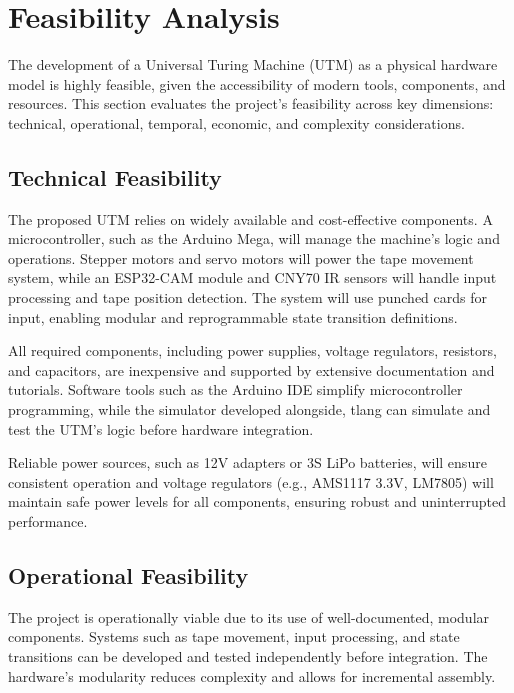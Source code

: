 \chapter{Feasibility Analysis}

The development of a Universal Turing Machine (UTM) as a physical hardware model is highly feasible, given the accessibility of modern tools, components, and resources. This section evaluates the project’s feasibility across key dimensions: technical, operational, temporal, economic, and complexity considerations.

\section{Technical Feasibility}

The proposed UTM relies on widely available and cost-effective components. A microcontroller, such as the Arduino Mega, will manage the machine's logic and operations. Stepper motors and servo motors will power the tape movement system, while an ESP32-CAM module and CNY70 IR sensors will handle input processing and tape position detection. The system will use punched cards for input, enabling modular and reprogrammable state transition definitions.

All required components, including power supplies, voltage regulators, resistors, and capacitors, are inexpensive and supported by extensive documentation and tutorials. Software tools such as the Arduino IDE simplify microcontroller programming, while the simulator developed alongside, tlang\cite{tlang} can simulate and test the UTM’s logic before hardware integration. 

Reliable power sources, such as 12V adapters or 3S LiPo batteries, will ensure consistent operation and voltage regulators (e.g., AMS1117 3.3V, LM7805) will maintain safe power levels for all components, ensuring robust and uninterrupted performance.

\section{Operational Feasibility}

The project is operationally viable due to its use of well-documented, modular components. Systems such as tape movement, input processing, and state transitions can be developed and tested independently before integration. The hardware’s modularity reduces complexity and allows for incremental assembly.

